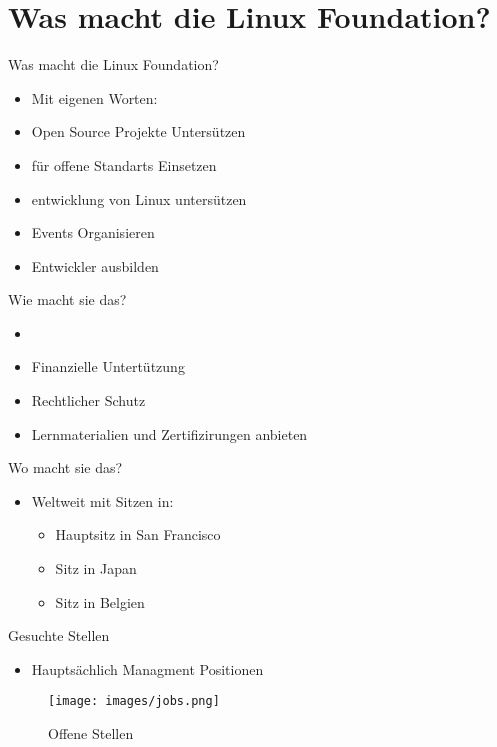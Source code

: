 \documentclass[11pt,aspectratio=169]{beamer}
\begin{document}
\section{Was macht die Linux Foundation?}

\begin{frame}{Was macht die Linux Foundation?}
	\begin{itemize}
		\item<1-> Mit eigenen Worten:\cite{About}
		\item<2-> Open Source Projekte Untersützen
		\item<3-> für offene Standarts Einsetzen
		\item <4->entwicklung von Linux untersützen
		\item<5-> Events Organisieren\cite{Events}
		\item<6-> Entwickler ausbilden\cite{Training}
	\end{itemize}

\end{frame}

\begin{frame}{Wie macht sie das?}
	\begin{itemize}
		\item <1->\cite{Grundprinziepe}
		\item <2->Finanzielle Untertützung
		\item <3->Rechtlicher Schutz
		\item <4->Lernmaterialien und Zertifizirungen anbieten\cite{Training}
	\end{itemize}
\end{frame}
\begin{frame}{Wo macht sie das?}
	\begin{itemize}
		\item Weltweit mit Sitzen in:
		      \begin{itemize}
			      \item Hauptsitz in San Francisco \cite{Locations}
			      \item Sitz in Japan\cite{Locations}
			      \item Sitz in Belgien\cite{Locations}
		      \end{itemize}
	\end{itemize}
\end{frame}
\begin{frame}{Gesuchte Stellen} \begin{itemize}

		\item	Hauptsächlich Managment Positionen
	\end{itemize}
	\begin{figure}
		\centering
		\texttt{[image: images/jobs.png]}\cite{Positionen}
		\caption{Offene Stellen}
	\end{figure}

\end{frame}
\end{document}
